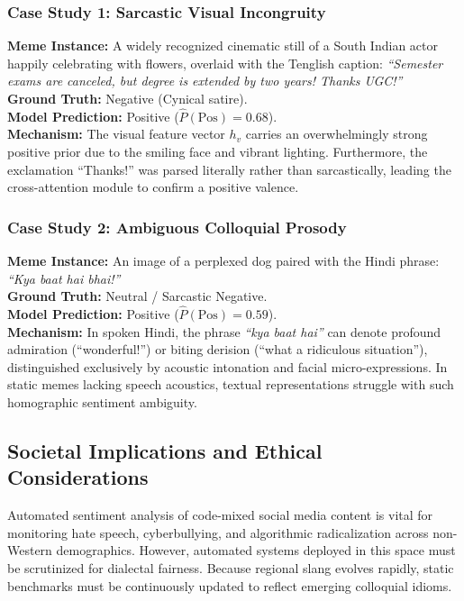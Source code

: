 \documentclass[10pt,journal,compsoc]{IEEEtran}
\begin{document}
\subsubsection{Case Study 1: Sarcastic Visual Incongruity}
\textbf{Meme Instance:} A widely recognized cinematic still of a South Indian actor happily celebrating with flowers, overlaid with the Tenglish caption: \textit{``Semester exams are canceled, but degree is extended by two years! Thanks UGC!''} \\
\textbf{Ground Truth:} Negative (Cynical satire). \\
\textbf{Model Prediction:} Positive ($\hat{P}(\text{Pos}) = 0.68$). \\
\textbf{Mechanism:} The visual feature vector $h_v$ carries an overwhelmingly strong positive prior due to the smiling face and vibrant lighting. Furthermore, the exclamation ``Thanks!'' was parsed literally rather than sarcastically, leading the cross-attention module to confirm a positive valence.

\subsubsection{Case Study 2: Ambiguous Colloquial Prosody}
\textbf{Meme Instance:} An image of a perplexed dog paired with the Hindi phrase: \textit{``Kya baat hai bhai!''} \\
\textbf{Ground Truth:} Neutral / Sarcastic Negative. \\
\textbf{Model Prediction:} Positive ($\hat{P}(\text{Pos}) = 0.59$). \\
\textbf{Mechanism:} In spoken Hindi, the phrase \textit{``kya baat hai''} can denote profound admiration (``wonderful!'') or biting derision (``what a ridiculous situation''), distinguished exclusively by acoustic intonation and facial micro-expressions. In static memes lacking speech acoustics, textual representations struggle with such homographic sentiment ambiguity.

\subsection{Societal Implications and Ethical Considerations}
Automated sentiment analysis of code-mixed social media content is vital for monitoring hate speech, cyberbullying, and algorithmic radicalization across non-Western demographics. However, automated systems deployed in this space must be scrutinized for dialectal fairness. Because regional slang evolves rapidly, static benchmarks must be continuously updated to reflect emerging colloquial idioms.
\end{document}
